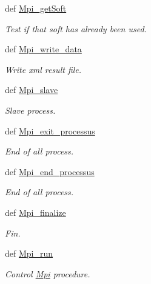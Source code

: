 \begin{DoxyCompactItemize}
def \hyperlink{classMycarn_1_1Mpi_1_1Mpi_a963ffae810ef25aac105a77c2ef377ec}{\-Mpi\-\_\-get\-Soft}
\begin{DoxyCompactList}\small\item\em \-Test if that soft has already been used. \end{DoxyCompactList}\item 
def \hyperlink{classMycarn_1_1Mpi_1_1Mpi_a95b7ab2027d80c22d494100c169b26a1}{\-Mpi\-\_\-write\-\_\-data}
\begin{DoxyCompactList}\small\item\em \-Write xml result file. \end{DoxyCompactList}\item 
def \hyperlink{classMycarn_1_1Mpi_1_1Mpi_ae565234edc65956edab58bd0a9f7db6d}{\-Mpi\-\_\-slave}
\begin{DoxyCompactList}\small\item\em \-Slave process. \end{DoxyCompactList}\item 
\hypertarget{classMycarn_1_1Mpi_1_1Mpi_a7265ce4618607762a4ba94ebc54b3191}{
def \hyperlink{classMycarn_1_1Mpi_1_1Mpi_a7265ce4618607762a4ba94ebc54b3191}{\-Mpi\-\_\-exit\-\_\-processus}}
\label{classMycarn_1_1Mpi_1_1Mpi_a7265ce4618607762a4ba94ebc54b3191}

\begin{DoxyCompactList}\small\item\em \-End of all process. \end{DoxyCompactList}\item 
\hypertarget{classMycarn_1_1Mpi_1_1Mpi_ab0a4e2da70290d397b53995aaa2992aa}{
def \hyperlink{classMycarn_1_1Mpi_1_1Mpi_ab0a4e2da70290d397b53995aaa2992aa}{\-Mpi\-\_\-end\-\_\-processus}}
\label{classMycarn_1_1Mpi_1_1Mpi_ab0a4e2da70290d397b53995aaa2992aa}

\begin{DoxyCompactList}\small\item\em \-End of all process. \end{DoxyCompactList}\item 
\hypertarget{classMycarn_1_1Mpi_1_1Mpi_a0342273da9b9cf59c5e9e7861fc8de80}{
def \hyperlink{classMycarn_1_1Mpi_1_1Mpi_a0342273da9b9cf59c5e9e7861fc8de80}{\-Mpi\-\_\-finalize}}
\label{classMycarn_1_1Mpi_1_1Mpi_a0342273da9b9cf59c5e9e7861fc8de80}

\begin{DoxyCompactList}\small\item\em \-Fin. \end{DoxyCompactList}\item 
def \hyperlink{classMycarn_1_1Mpi_1_1Mpi_ac24dc7ce9775a67902d9a0d6c4442dd9}{\-Mpi\-\_\-run}
\begin{DoxyCompactList}\small\item\em \-Control \hyperlink{classMycarn_1_1Mpi_1_1Mpi}{\-Mpi} procedure. \end{DoxyCompactList}\end{DoxyCompactItemize}
